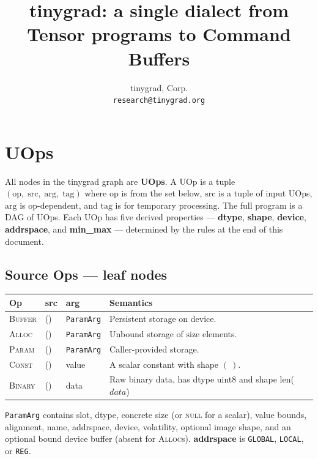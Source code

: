 \documentclass[10pt,letterpaper]{article}
\title{tinygrad: a single dialect from Tensor programs to Command Buffers}
\author{tinygrad, Corp. \\ \texttt{research@tinygrad.org}}
\date{}
\newcommand{\op}[1]{\textsc{#1}}
\begin{document}
\maketitle
\thispagestyle{empty}

\section*{UOps}

All nodes in the tinygrad graph are \textbf{UOps}. A UOp is a tuple $(\mathrm{op},\;\mathrm{src},\;\mathrm{arg},\;\mathrm{tag})$ where $\mathrm{op}$ is from the set below, $\mathrm{src}$ is a tuple of input UOps, $\mathrm{arg}$ is op-dependent, and $\mathrm{tag}$ is for temporary processing. The full program is a DAG of UOps. Each UOp has five derived properties --- \textbf{dtype}, \textbf{shape}, \textbf{device}, \textbf{addrspace}, and \textbf{min\_max} --- determined by the rules at the end of this document.

\subsection*{Source Ops \normalfont\small--- leaf nodes}

\begin{tabular}{@{}l l l l@{}}
\toprule
\textbf{Op} & \textbf{src} & \textbf{arg} & \textbf{Semantics} \\
\midrule
\op{Buffer} & () & \texttt{ParamArg} &
  Persistent storage on device. \\
\op{Alloc} & () & \texttt{ParamArg} &
  Unbound storage of $\mathrm{size}$ elements. \\
\op{Param} & () & \texttt{ParamArg} &
  Caller-provided storage. \\
\op{Const} & () & value &
  A scalar constant with shape $(\ )$. \\
\op{Binary} & () & data & Raw binary data, has dtype uint8 and shape len($data$)  \\
\bottomrule
\end{tabular}

\smallskip
\texttt{ParamArg} contains slot, dtype, concrete size (or \textsc{null} for a scalar), value bounds, alignment, name, addrspace, device, volatility, optional image shape, and an optional bound device buffer (absent for \op{Alloc}s). \textbf{addrspace} is \texttt{GLOBAL}, \texttt{LOCAL}, or \texttt{REG}.

\end{document}
